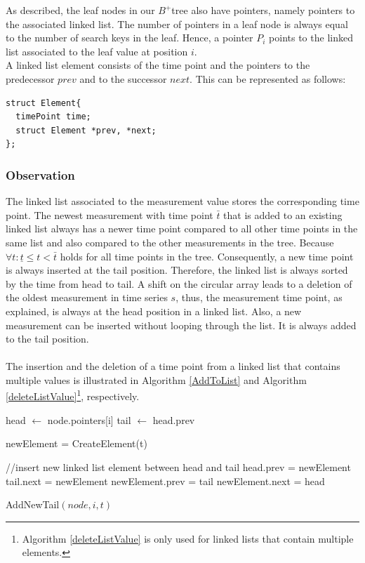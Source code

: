 \documentclass[abstracton,12pt,oneside]{scrreprt}
\begin{document}
As described, the leaf nodes in our $B^+$tree also have pointers, namely pointers to the associated linked list. The number of pointers in a leaf node is always equal to the number of search keys in the leaf. Hence, a pointer $P_i$ points to the linked list associated to the leaf value at position $i$.\\
A linked list element consists of the time point and the pointers to the predecessor $prev$ and to the successor $next$. This can be represented as follows: 
\lstset{language=C}
\begin{lstlisting}
struct Element{
  timePoint time;
  struct Element *prev, *next;
};
\end{lstlisting}

\subsubsection{Observation}
The linked list associated to the measurement value stores the corresponding time point. The newest measurement with time point $\bar{t}$ that is added to an existing linked list always has a newer time point compared to all other time points in the same list and also compared to the other measurements in the tree. Because $\forall t: \underline{t} \leq t < \bar{t}$ holds for all time points in the tree. Consequently, a new time point is always inserted at the tail position. Therefore, the linked list is always sorted by the time from head to tail. A shift on the circular array leads to a deletion of the oldest measurement in time series $s$, thus, the measurement time point, as explained, is always at the head position in a linked list. Also, a new measurement can be inserted without looping through the list. It is always added to the tail position.\\ \\
The insertion and the deletion of a time point from a linked list that contains multiple values is illustrated in Algorithm \ref{AddToList} and Algorithm \ref{deleteListValue}\footnote{Algorithm \ref{deleteListValue} is only used for linked lists that contain multiple elements.}, respectively.
\BlankLine
\begin{algorithm}[H]
	\IncMargin{1em}
	\SetAlgoLined
	\DontPrintSemicolon

		head $\leftarrow$ node.pointers[i]\;
		tail $\leftarrow$ head.prev\; 
		
		newElement = CreateElement(t)\;
		
		//insert new linked list element between head and tail\;
		head.prev = newElement\;
		tail.next = newElement\;
	    newElement.prev = tail\;
		newElement.next = head\;

	
	\caption{AddNewTail$(node, i, t)$}
	\label{AddToList}
\end{algorithm}
\end{document}

